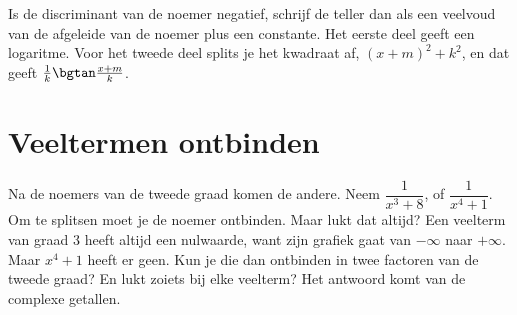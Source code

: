 
\begin{werkwijze}
Is de discriminant van de noemer negatief, schrijf de teller dan als een veelvoud van de afgeleide van de noemer plus een constante. Het eerste deel geeft een logaritme. Voor het tweede deel splits je het kwadraat af, $(x + m)^2 + k^2$, en dat geeft $\tfrac1k \bgtan\tfrac{x + m}{k}$.
\end{werkwijze}


\begin{oefeningen}
\end{oefeningen}

\section{Veeltermen ontbinden}

Na de noemers van de tweede graad komen de andere. Neem $\dfrac{1}{x^3 + 8}$, of $\dfrac{1}{x^4 + 1}$. Om te splitsen moet je de noemer ontbinden. Maar lukt dat altijd? Een veelterm van graad 3 heeft altijd een nulwaarde, want zijn grafiek gaat van $-\infty$ naar $+\infty$. Maar $x^4 + 1$ heeft er geen. Kun je die dan ontbinden in twee factoren van de tweede graad? En lukt zoiets bij elke veelterm? Het antwoord komt van de complexe getallen.

